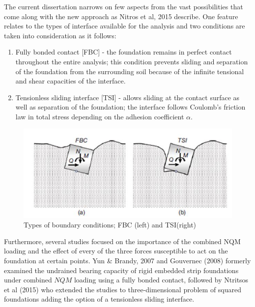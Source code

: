 \documentclass[12pt,a4paper]{report}
\begin{document}
The current dissertation narrows on few aspects from the vast possibilities that come along with the new approach as Nitros et al, 2015 \cite{ntritsos2015static} describe. One feature relates to the types of interface available for the analysis and two conditions are taken into consideration as it follows:
\begin{enumerate}
	\item Fully bonded contact [FBC] - the foundation remains in perfect contact throughout the entire analysis; this condition prevents sliding and separation of the foundation from the surrounding soil because of the infinite tensional and shear capacities of the interface.
	\item Tensionless sliding interface [TSI] - allows sliding at the contact surface as well as separation of the foundation; the interface follows Coulomb's friction law in total stress depending on the adhesion coefficient $\alpha$.
\end{enumerate}

\begin{figure}[h!]
	\centering
	\includegraphics[width=0.8\linewidth]{"fbc"}
	\caption{Types of boundary conditions; FBC (left) and TSI(right)}
	\label{FBC}
\end{figure}
Furthermore, several studies focused on the importance of the combined NQM loading and the effect of every of the three forces susceptible to act on the foundation at certain points. Yun \& Brandy, 2007 and Gouvernec (2008) \cite{randolph2011offshore} formerly examined the undrained bearing capacity of rigid embedded strip foundations under combined $NQM$ loading using a fully bonded contact, followed by Ntritsos et al (2015) who extended the studies to three-dimensional problem of squared foundations adding the option of a tensionless sliding interface.
\end{document}
